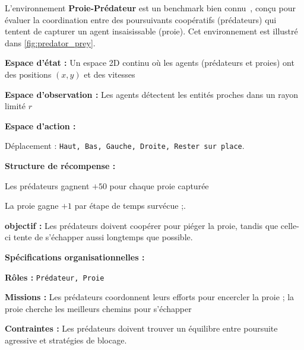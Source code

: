 L'environnement \textbf{Proie-Prédateur} est un benchmark  bien connu~\cite{lowe2017multi}, conçu pour évaluer la coordination entre des poursuivants coopératifs (prédateurs) qui tentent de capturer un agent insaisissable (proie). Cet environnement est illustré dans \autoref{fig:predator_prey}.
%
\begin{enumerate*}[label={\roman*)}, itemjoin={; \quad}]
    \item \textbf{Espace d'état :} Un espace 2D continu où les agents (prédateurs et proies) ont des positions $(x, y)$ et des vitesses
    \item \textbf{Espace d'observation :} Les agents détectent les entités proches dans un rayon limité $r$
    \item \textbf{Espace d'action :}
    \begin{enumerate*}[label={\roman*)}, itemjoin={; \quad}]
        \item Déplacement : \texttt{Haut, Bas, Gauche, Droite, Rester sur place}.
    \end{enumerate*}
    \item \textbf{Structure de récompense :}
    \begin{enumerate*}[label={\roman*)}, itemjoin={; \quad}]
        \item Les prédateurs gagnent $+50$ pour chaque proie capturée
        \item La proie gagne $+1$ par étape de temps survécue ;.
    \end{enumerate*}
    \item \textbf{objectif :} Les prédateurs doivent coopérer pour piéger la proie, tandis que celle-ci tente de s'échapper aussi longtemps que possible.
\end{enumerate*}
%
\textbf{Spécifications organisationnelles :}
\begin{enumerate*}[label={\roman*)}, itemjoin={; \quad}]
    \item \textbf{Rôles :} \texttt{Prédateur, Proie}
    \item \textbf{Missions :} Les prédateurs coordonnent leurs efforts pour encercler la proie ; la proie cherche les meilleurs chemins pour s'échapper
    \item \textbf{Contraintes :} Les prédateurs doivent trouver un équilibre entre poursuite agressive et stratégies de blocage.
\end{enumerate*}
%
